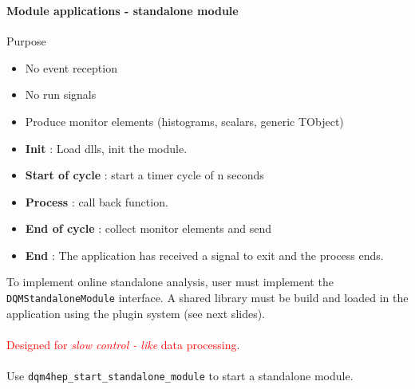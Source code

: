 \documentclass[8pt]{beamer}
\begin{document}
  
  \begin{frame}[containsverbatim]
    \frametitle{\secname}
    \framesubtitle{Module applications - standalone module}
    
    \begin{minipage}{0.78\textwidth}
      \begin{block}{Purpose}
        \begin{itemize}
          \item No event reception
          \item No run signals
          \item Produce monitor elements (histograms, scalars, generic TObject)
        \end{itemize}
      \end{block}
      
      \begin{itemize}
        \item \textbf{Init} : Load dlls, init the module.
        \item \textbf{Start of cycle} : start a timer cycle of n seconds
        \item \textbf{Process} : call back function.
        \item \textbf{End of cycle} : collect monitor elements and send
        \item \textbf{End} : The application has received a signal to exit and the process ends.
      \end{itemize}
      To implement online standalone analysis, user must implement the \verb|DQMStandaloneModule| interface. A shared library must be build and loaded in the application using the plugin system (see next slides). \\
      ~ \\
      \textcolor{red}{Designed for \textit{slow control - like} data processing}. \\
      ~ \\
      Use \verb|dqm4hep_start_standalone_module| to start a standalone module.
    \end{minipage}
    \begin{minipage}{0.2\textwidth}
      \begin{flushright}
\end{flushright}
\end{minipage}
\end{frame}
\end{document}
